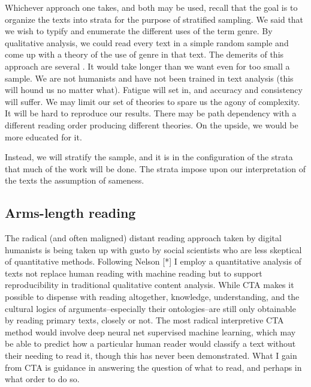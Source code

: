 \documentclass[]{book}
\theoremstyle{definition}
\theoremstyle{definition}
\theoremstyle{definition}
\theoremstyle{remark}
\begin{document}
Whichever approach one takes, and both may be used, recall that the goal
is to organize the texts into strata for the purpose of stratified
sampling. We said that we wish to typify and enumerate the different
uses of the term genre. By qualitative analysis, we could read every
text in a simple random sample and come up with a theory of the use of
genre in that text. The demerits of this approach are several
\citep[c.f.][5]{Nelson2017Computational}. It would take longer than we
want even for too small a sample. We are not humanists and have not been
trained in text analysis (this will hound us no matter what). Fatigue
will set in, and accuracy and consistency will suffer. We may limit our
set of theories to spare us the agony of complexity. It will be hard to
reproduce our results. There may be path dependency with a different
reading order producing different theories. On the upside, we would be
more educated for it.

Instead, we will stratify the sample, and it is in the configuration of
the strata that much of the work will be done. The strata impose upon
our interpretation of the texts the assumption of sameness.

\hypertarget{arms-length-reading}{%
\subsection{Arms-length reading}\label{arms-length-reading}}

The radical (and often maligned) distant reading approach taken by
digital humanists is being taken up with gusto by social scientists who
are less skeptical of quantitative methods. Following Nelson
{[}*\citet{Nelson2017Computational}{]} I employ a quantitative analysis
of texts not replace human reading with machine reading but to support
reproducibility in traditional qualitative content analysis. While CTA
makes it possible to dispense with reading altogether, knowledge,
understanding, and the cultural logics of arguments--especially their
ontologies--are still only obtainable by reading primary texts, closely
or not. The most radical interpretive CTA method would involve deep
neural net supervised machine learning, which may be able to predict how
a particular human reader would classify a text without their needing to
read it, though this has never been demonstrated. What I gain from CTA
is guidance in answering the question of what to read, and perhaps in
what order to do so.
\end{document}
